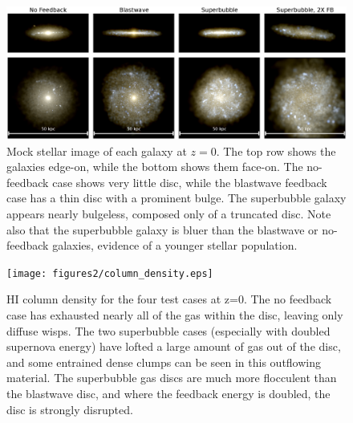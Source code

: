 \begin{figure}
    
    \includegraphics[width=\textwidth]{figures2/stellar_image.eps}
    \caption[Mock stellar image of galaxy at z=0 with different feedback
    models]{Mock stellar image of each galaxy at $z=0$.  The top row shows the
    galaxies edge-on, while the bottom shows them face-on.  The no-feedback case
    shows very little disc, while the blastwave feedback case has a thin disc
    with a prominent bulge.  The superbubble galaxy appears nearly bulgeless,
    composed only of a truncated disc. Note also that the superbubble galaxy is
    bluer than the blastwave or no-feedback galaxies, evidence of a younger
    stellar population.}
    \label{stellar_image}
\end{figure}
\begin{figure}
    \texttt{[image: figures2/column\_density.eps]}
    \caption[HI column density in a galaxy at z=0 with different feedback models]{HI
    column density for the four test cases at z=0.  The no feedback case has
    exhausted nearly all of the gas within the disc, leaving only diffuse wisps.
    The two superbubble cases (especially with doubled supernova energy) have
    lofted a large amount of gas out of the disc, and some entrained dense
    clumps can be seen in this outflowing material.  The superbubble gas discs
    are much more flocculent than the blastwave disc, and where the feedback
    energy is doubled, the disc is strongly disrupted.}
    \label{column_density}
\end{figure}
